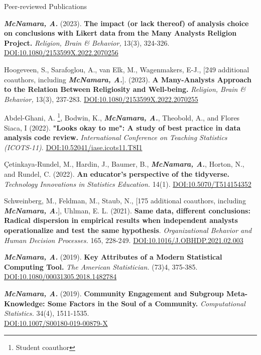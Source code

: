 \documentclass{resume} %
\begin{document}

\begin{rSection}{Peer-reviewed Publications}

{\bf \em McNamara, A.} (2023). {\bf The impact (or lack thereof) of analysis choice on conclusions with Likert data from the Many Analysts Religion Project.} {\em Religion, Brain \& Behavior,} 13(3), 324-326. \href{https://doi.org/10.1080/2153599X.2022.2070256}{DOI:10.1080/2153599X.2022.2070256}

Hoogeveen, S., Sarafoglou, A., van Elk, M., Wagenmakers, E-J., [249 additional coauthors, including {\bf \em{McNamara, A.}}]. (2023). {\bf A Many-Analysts Approach to the Relation Between Religiosity and Well-being.} {\em Religion, Brain \& Behavior,} 13(3), 237-283. \href{https://doi.org/10.1080/2153599X.2022.2070255}{DOI:10.1080/2153599X.2022.2070255}

Abdel-Ghani, A. \footnote{Student coauthor}, Bodwin, K., {\bf \em McNamara, A.}, Theobold, A., and Flores Siaca, I (2022). {\bf "Looks okay to me": A study of best practice in data analysis code review.} {\em International Conference on Teaching Statistics (ICOTS-11)}. \href{https://doi.org/10.52041/iase.icots11.T8I1}{DOI:10.52041/iase.icots11.T8I1}

\c{C}etinkaya-Rundel, M., Hardin, J., Baumer, B., {\bf \em McNamara, A.}, Horton, N., and Rundel, C. (2022). {\bf An educator's perspective of the tidyverse.} {\em Technology Innovations in Statistics Education.} 14(1). \href{https://doi.org/10.5070/T514154352}{DOI:10.5070/T514154352}

Schweinberg, M., Feldman, M., Staub, N., [175 additional coauthors, including {\bf \em{McNamara, A.}}], Uhlman, E. L. (2021). {\bf Same data, different conclusions: Radical dispersion in empirical results when independent analysts operationalize and test the same hypothesis}. {\em Organizational Behavior and Human Decision Processes.} 165, 228-249. \href{https://doi.org/10.1016/j.obhdp.2021.02.003}{DOI:10.1016/J.OBHDP.2021.02.003}

{\bf \em{McNamara, A.}} (2019). {\bf Key Attributes of a Modern Statistical Computing Tool.} {\em The American Statistician.} (73)4, 375-385. \href{https://doi.org/10.1080/00031305.2018.1482784}{DOI:10.1080/00031305.2018.1482784}

{\bf \em McNamara, A.} (2019). {\bf Community Engagement and Subgroup Meta-Knowledge: Some Factors in the Soul of a Community.} { \em Computational Statistics.} 34(4), 1511-1535. 
\\\href{https://doi.org/10.1007/S00180-019-00879-X}{DOI:10.1007/S00180-019-00879-X}


\end{rSection}
\end{document}
